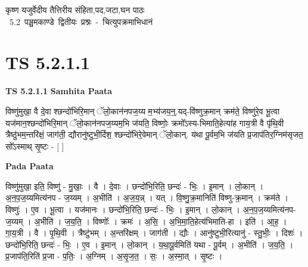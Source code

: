 \documentclass[17pt]{extarticle}
\begin{document}
\begin{titlepage}
    \begin{center}
 
\begin{sanskrit}
    { \Huge
    कृष्ण यजुर्वेदीय तैत्तिरीय संहिता,पद,जटा,घन पाठः 
    }
    \\
    \vspace{2.5cm}
    \mbox{ \Huge
    5.2      पञ्चमकाण्डे द्वितीयः प्रश्नः - चित्युपक्रमाभिधानं   }
\end{sanskrit}
\end{center}

\end{titlepage}
\tableofcontents
\pagebreak

\section*{ TS 5.2.1.1 }

\textbf{TS 5.2.1.1 } \newline
\textbf{Samhita Paata} \newline

विष्णु॑मुखा॒ वै दे॒वा श्छन्दो॑भिरि॒मान् ॅलो॒कान॑नपज॒य्य म॒भ्य॑जय॒न्॒.यद्-वि॑ष्णुक्र॒मान् क्रम॑ते॒ विष्णु॑रे॒व भू॒त्वा यज॑मान॒श्छन्दो॑भिरि॒मान् ॅलो॒कान॑नपज॒य्यम॒भि ज॑यति॒ विष्णोः॒ क्रमो᳚ऽस्य-भिमाति॒हेत्या॑ह गाय॒त्री वै पृ॑थि॒वी त्रैष्ठु॑भम॒न्तरि॑क्षं॒ जाग॑ती॒ द्यौरानु॑ष्टुभी॒र्दिश॒ श्छन्दो॑भिरे॒वेमान् ॅलो॒कान्. य॑था पू॒र्वम॒भि ज॑यति प्र॒जाप॑तिर॒ग्निम॑सृजत॒ सो᳚ऽस्माथ् सृ॒ष्टः - [  ] \newline

\textbf{Pada Paata} \newline

विष्णु॑मुखा॒ इति॒ विष्णु॑ - मु॒खाः॒ । वै । दे॒वाः । छन्दो॑भि॒रिति॒ छन्दः॑ - भिः॒ । इ॒मान् । लो॒कान् । अ॒न॒प॒ज॒य्यमित्य॑नप - ज॒य्यम् । अ॒भीति॑ । अ॒ज॒य॒न्न् । यत् । वि॒ष्णु॒क्र॒मानिति॑ विष्णु-क्र॒मान् । क्रम॑ते । विष्णुः॑ । ए॒व । भू॒त्वा । यज॑मानः । छन्दो॑भि॒रिति॒ छन्दः॑ - भिः॒ । इ॒मान् । लो॒कान् । अ॒न॒प॒ज॒य्यमित्य॑नप-ज॒य्यम् । अ॒भीति॑ । ज॒य॒ति॒ । विष्णोः᳚ । क्रमः॑ । अ॒सि॒ । अ॒भि॒मा॒ति॒हेत्य॑भिमाति-हा । इति॑ । आ॒ह॒ । गा॒य॒त्री । वै । पृ॒थि॒वी । त्रैष्टु॑भम् । अ॒न्तरि॑क्षम् । जाग॑ती । द्यौः । आनु॑ष्टुभी॒रित्यानु॑ - स्तु॒भीः॒ । दिशः॑ । छन्दो॑भि॒रिति॒ छन्दः॑ - भिः॒ । ए॒व । इ॒मान् । लो॒कान् । य॒था॒पू॒र्वमिति॑ यथा - पू॒र्वम् । अ॒भीति॑ । ज॒य॒ति॒ । प्र॒जाप॑ति॒रिति॑ प्र॒जा - प॒तिः॒ । अ॒ग्निम् । अ॒सृ॒ज॒त॒ । सः॒ । अ॒स्मा॒त् । सृ॒ष्टः ।  \newline
\end{document}
